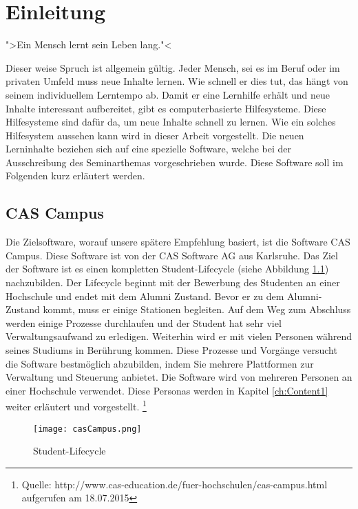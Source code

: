 
\chapter{Einleitung}
\label{ch:Introduction}
">Ein Mensch lernt sein Leben lang."< \par

Dieser weise Spruch ist allgemein gültig. Jeder Mensch, sei es im Beruf oder im privaten Umfeld muss neue Inhalte lernen. Wie schnell er dies tut, das hängt von seinem individuellem Lerntempo ab. Damit er eine Lernhilfe erhält und neue Inhalte interessant aufbereitet, gibt es computerbasierte Hilfesysteme. Diese Hilfesysteme sind dafür da, um neue Inhalte schnell zu lernen. Wie ein solches Hilfesystem aussehen kann wird in dieser Arbeit vorgestellt. Die neuen Lerninhalte beziehen sich auf eine spezielle Software, welche bei der Ausschreibung des Seminarthemas vorgeschrieben wurde. Diese Software soll im Folgenden kurz erläutert werden.




\section{CAS Campus}
Die Zielsoftware, worauf unsere spätere Empfehlung basiert, ist die Software CAS Campus. Diese Software ist von der CAS Software AG aus Karlsruhe. Das Ziel der Software ist es einen kompletten Student-Lifecycle (siehe Abbildung \ref{img1:stdLife}) nachzubilden. Der Lifecycle beginnt mit der Bewerbung des Studenten an einer Hochschule und endet mit dem Alumni Zustand. Bevor er zu dem Alumni-Zustand kommt, muss er einige Stationen begleiten. Auf dem Weg zum Abschluss werden einige Prozesse durchlaufen und der Student hat sehr viel Verwaltungsaufwand zu erledigen. Weiterhin wird er mit vielen Personen während seines Studiums in Berührung kommen. Diese Prozesse und Vorgänge versucht die Software bestmöglich abzubilden, indem Sie mehrere Plattformen zur Verwaltung und Steuerung anbietet. Die Software wird von mehreren Personen an einer Hochschule verwendet. Diese Personas werden in Kapitel \ref{ch:Content1} weiter erläutert und vorgestellt. \footnote{Quelle: http://www.cas-education.de/fuer-hochschulen/cas-campus.html aufgerufen am 18.07.2015}
\begin{figure}[ht]
\begin{center}
\texttt{[image: casCampus.png]}
\caption{Student-Lifecycle}
\label{img1:stdLife}
\end{center}
\end{figure} 

